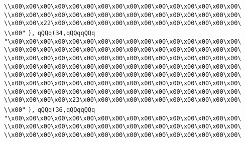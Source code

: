 \verb|\\x00\x00\x00\x00\x00\x00\x00\x00\x00\x00\x00\x00\x00\x00\x00\x00\|\newline
\verb|\\x00\x00\x00\x00\x00\x00\x00\x00\x00\x00\x00\x00\x00\x00\x00\x00\|\newline
\verb|\\x00\x00\x22\x00\x00\x00\x00\x00\x00\x00\x00\x00\x00\x00\x00\x00\|\newline
\verb|\\x00"|\newline
\verb|),|\newline
\verb|qQQq(34,qQQqqQQq|\newline
\verb|"\x00\x00\x00\x00\x00\x00\x00\x00\x00\x00\x00\x00\x00\x00\x00\x00\|\newline
\verb|\\x00\x00\x00\x00\x00\x00\x00\x00\x00\x00\x00\x00\x00\x00\x00\x00\|\newline
\verb|\\x00\x00\x00\x00\x00\x00\x00\x00\x00\x00\x00\x00\x00\x00\x00\x00\|\newline
\verb|\\x00\x00\x00\x00\x00\x00\x00\x00\x00\x00\x00\x00\x00\x00\x00\x00\|\newline
\verb|\\x00\x00\x00\x00\x00\x00\x00\x00\x00\x00\x00\x00\x00\x00\x00\x00\|\newline
\verb|\\x00\x00\x00\x00\x00\x00\x00\x00\x00\x00\x00\x00\x00\x00\x00\x00\|\newline
\verb|\\x00\x00\x00\x00\x00\x00\x00\x00\x00\x00\x00\x00\x00\x00\x00\x00\|\newline
\verb|\\x00\x00\x00\x00\x23\x00\x00\x00\x00\x00\x00\x00\x00\x00\x00\x00\|\newline
\verb|\\x00"|\newline
\verb|),|\newline
\verb|qQQq(36,qQQqqQQq|\newline
\verb|"\x00\x00\x00\x00\x00\x00\x00\x00\x00\x00\x00\x00\x00\x00\x00\x00\|\newline
\verb|\\x00\x00\x00\x00\x00\x00\x00\x00\x00\x00\x00\x00\x00\x00\x00\x00\|\newline
\verb|\\x00\x00\x00\x00\x00\x00\x00\x00\x00\x00\x00\x00\x00\x00\x00\x00\|\newline
